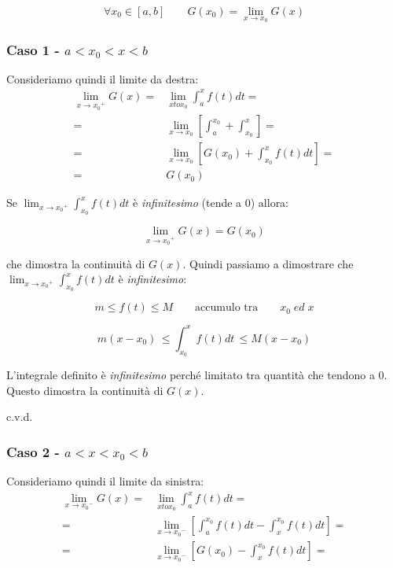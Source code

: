 \documentclass[../dimostrazioni]{subfiles}
\begin{document}
            \[\forall x_0 \in [a, b] \qquad G(x_0) = \lim_{x \to  x_0} G(x) \]
            
            \subsubsection*{Caso 1 - \(a < x_0 < x < b \)}
                Consideriamo quindi il limite da destra:
                \begin{align*}
                    \lim_{x \to {x_0}^{+}}G(x) =& \lim_{x to x_0}{\int_{a}^{x}f(t) dt} = \\
                    =& \lim_{x \to x_0} \left[ \int_{a}^{x_0} + \int_{x_0}^{x} \right] = \\
                    =& \lim_{x \to x_0} \left[ G(x_0) + \int_{x_0}^{x} f(t) dt \right] = \\
                    =& G(x_0)
                \end{align*}

                Se \( \lim_{x \to {x_0}^{+}} \int_{x_0}^{x} f(t) dt \) è \emph{infinitesimo} (tende a 0) allora:

                \[  \lim_{x \to {x_0}^{+}}G(x) = G(x_0) \]

                che dimostra la continuità di \(G(x)\). Quindi passiamo a dimostrare che \( \lim_{x \to {x_0}^{+}} \int_{x_0}^{x} f(t) dt \) è \emph{infinitesimo}:

                \[m \leqslant f(t) \leqslant M \qquad \text {accumulo tra} \qquad x_0 \; ed \; x \]

                \[m(x-x_0) \, \leqslant \int_{x_0}^{x} f(t) dt \, \leqslant M(x-x_0) \]

                L'integrale definito è \emph{infinitesimo} perché limitato tra quantità che tendono a 0. Questo dimostra la continuità di \(G(x)\).

                c.v.d.
                
            \subsubsection*{Caso 2 - \(a < x < x_0 < b \)}
                Consideriamo quindi il limite da sinistra:
                \begin{align*}
                    \lim_{x \to {x_0}^{-}}G(x) =& \lim_{x to x_0}{\int_{a}^{x}f(t) dt} = \\
                    =& \lim_{x \to {x_0}^{-}} \left[ \int_{a}^{x_0}f(t) dt - \int_{x}^{x_0}f(t) dt \right] = \\
                    =& \lim_{x \to {x_0}^{-}} \left[ G(x_0) - \int_{x}^{x_0} f(t) dt \right] =
                \end{align*}
\end{document}
